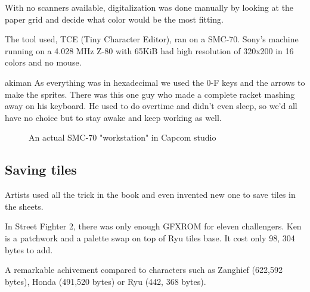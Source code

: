 With no scanners available, digitalization was done manually by looking at the paper grid and decide what color would be the most fitting.




The tool used, TCE (Tiny Character Editor), ran on a SMC-70. Sony's machine running on a 4.028 MHz Z-80 with 65KiB had high resolution of 320x200 in 16 colors and no mouse.

\begin{q}{akiman\cite{ar20160404}}
  As everything was in hexadecimal we used the 0-F keys and the arrows to make the sprites. There was this one guy who made a complete racket mashing away on his keyboard. He used to do overtime and didn't even sleep, so we'd all have no choice but to stay awake and keep working as well.
\end{q}

 \begin{figure}[H]
\caption*{An actual SMC-70 "workstation" in Capcom studio}
\end{figure}









\subsection{Saving tiles}
Artists used all the trick in the book and even invented new one to save tiles in the sheets. 

In Street Fighter 2, there was only enough GFXROM for eleven challengers. Ken is a patchwork and a palette swap on top of Ryu tiles base. It cost only 98, 304 bytes to add. 

A remarkable achivement compared to characters such as Zanghief (622,592 bytes), Honda (491,520 bytes) or Ryu (442, 368 bytes). 

\begin{minipage}[t]{0.19\linewidth}
\end{minipage}%
\hfill%
\begin{minipage}[t]{0.19\linewidth}
\end{minipage}
\hfill%
\begin{minipage}[t]{0.19\linewidth}
\end{minipage}%
\hfill%
\begin{minipage}[t]{0.19\linewidth}
\end{minipage}
\hfill%
\begin{minipage}[t]{0.19\linewidth}
\end{minipage}

